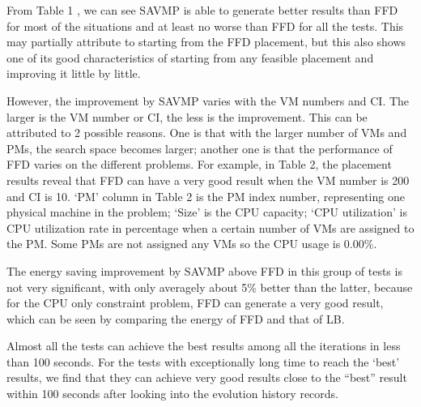 \documentclass[10pt, conference, compsocconf]{IEEEtran}
\begin{document}
From Table 1 , we can see SAVMP is able to generate
better results than FFD for most of the situations and at least no worse than FFD for all the tests.
This may partially attribute to starting from the FFD placement, but this also
shows one of its good characteristics of starting from any feasible placement
and improving it little by little.

However, the improvement by SAVMP varies with the VM numbers and CI. The larger
is the VM number or CI, the less is the improvement. This can be attributed to 2
possible reasons. One is that with the larger number of VMs and PMs, the search
space becomes larger; another one is that the performance of FFD varies on the
different problems. For example, in Table 2, the placement results reveal that
FFD can have a very good result when the VM number is 200 and CI is 10. `PM' column in Table 2
is the PM index number, representing one physical machine in the problem; `Size'
is the CPU capacity; `CPU utilization' is CPU utilization rate in percentage
when a certain number of VMs are assigned to the PM. Some PMs are not assigned any VMs so the CPU usage is
0.00\%.

The energy saving improvement by SAVMP above FFD in this group of tests is not
very significant, with only averagely about 5\% better than the latter, because for the CPU only
constraint problem, FFD can generate a very good result, which can be seen by
comparing the energy of FFD and that of LB.

Almost all the tests can achieve the best results among all the iterations in
less than 100 seconds. For the tests with exceptionally long time to reach the
`best' results, we find that they can achieve very good results close to
the ``best'' result within 100 seconds after looking into the evolution
history records.
\end{document}

